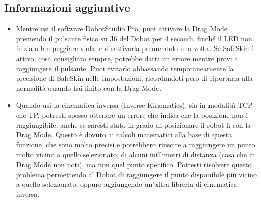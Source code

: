\documentclass[11pt,a4paper]{article}
\begin{document}
\subsection{Informazioni aggiuntive}
\label{sec:additional-info}

\begin{itemize}[leftmargin=1.2cm]

\item Mentre usi il software DobotStudio Pro, puoi attivare la Drag Mode premendo il pulsante fisico su J6 del Dobot per 4 secondi, finché il LED non inizia a lampeggiare viola, e disattivarla premendolo una volta. Se SafeSkin è attivo, cosa consigliata sempre, potrebbe darti un errore mentre provi a raggiungere il pulsante. Puoi evitarlo abbassando temporaneamente la precisione di SafeSkin nelle impostazioni, ricordandoti però di riportarla alla normalità quando hai finito con la Drag Mode.

\item Quando usi la cinematica inversa (Inverse Kinematics), sia in modalità TCP che TP, potresti spesso ottenere un errore che indica che la posizione non è raggiungibile, anche se saresti stato in grado di posizionare il robot lì con la Drag Mode. Questo è dovuto ai calcoli matematici alla base di questa funzione, che sono molto precisi e potrebbero riuscire a raggiungere un punto molto vicino a quello selezionato, di alcuni millimetri di distanza (cosa che in Drag Mode non noti), ma non quel punto specifico. Potresti risolvere questo problema permettendo al Dobot di raggiungere il punto disponibile più vicino a quello selezionato, oppure aggiungendo un'altra libreria di cinematica inversa.

\end{itemize}
\end{document}
